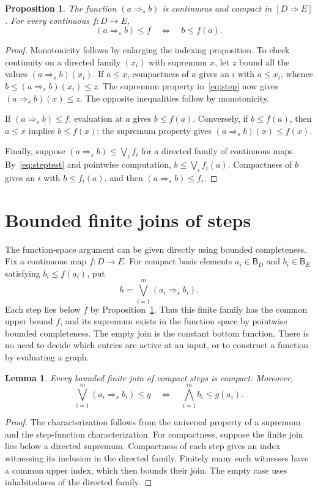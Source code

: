 \documentclass[11pt,a4paper]{article}
\newtheorem{lemma}[theorem]{Lemma}
\newtheorem{proposition}[theorem]{Proposition}
\theoremstyle{definition}
\theoremstyle{remark}
\newcommand{\B}{\mathsf B}
\newcommand{\Cont}[2]{[#1\mathbin{\Rightarrow}#2]}
\newcommand{\step}[2]{(#1\mathbin{\Rightarrow}_{\!s}#2)}
\newcommand{\lub}{\bigvee}
\begin{document}
\begin{proposition}\label{prop:step}
The function $\step a b$ is continuous and compact in $\Cont D E$.
For every continuous $f:D\to E$,
\begin{equation}\label{eq:steptest}
 \step a b\leq f \quad\Longleftrightarrow\quad b\leq f(a).
\end{equation}
\end{proposition}
\begin{proof}
Monotonicity follows by enlarging the indexing proposition. To check
continuity on a directed family $(x_i)$ with supremum $x$, let $z$ bound
all the values $\step a b(x_i)$. If $a\leq x$, compactness of $a$ gives
an $i$ with $a\leq x_i$, whence $b\leq\step a b(x_i)\leq z$.
The supremum property in~\eqref{eq:step} now gives $\step a b(x)\leq z$.
The opposite inequalities follow by monotonicity.

If $\step a b\leq f$, evaluation at $a$ gives $b\leq f(a)$.
Conversely, if $b\leq f(a)$, then $a\leq x$ implies $b\leq f(x)$;
the supremum property gives $\step a b(x)\leq f(x)$.

Finally, suppose $\step a b\leq\lub_i f_i$ for a directed family of
continuous maps. By~\eqref{eq:steptest} and pointwise computation,
$b\leq\lub_i f_i(a)$. Compactness of $b$ gives an $i$ with
$b\leq f_i(a)$, and then $\step a b\leq f_i$.
\end{proof}

\section{Bounded finite joins of steps}

The function-space argument can be given directly using bounded
completeness. Fix a continuous map $f:D\to E$. For compact basis elements
$a_i\in\B_D$ and $b_i\in\B_E$ satisfying $b_i\leq f(a_i)$, put
\[
 h=\bigvee_{i=1}^{m}\step{a_i}{b_i}.
\]
Each step lies below $f$ by Proposition~\ref{prop:step}. Thus this finite
family has the common upper bound $f$, and its supremum exists in the
function space by pointwise bounded completeness. The empty join is the
constant bottom function. There is no need to decide which entries are
active at an input, or to construct a function by evaluating a graph.

\begin{lemma}\label{lem:boundedsteps}
Every bounded finite join of compact steps is compact. Moreover,
\[
 \bigvee_{i=1}^{m}\step{a_i}{b_i}\leq g
 \quad\Longleftrightarrow\quad
 \bigwedge_{i=1}^{m} b_i\leq g(a_i).
\]
\end{lemma}
\begin{proof}
The characterization follows from the universal property of a supremum
and the step-function characterization. For compactness, suppose the
finite join lies below a directed supremum. Compactness of each step
gives an index witnessing its inclusion in the directed family. Finitely
many such witnesses have a common upper index, which then bounds their
join. The empty case uses inhabitedness of the directed family.
\end{proof}
\end{document}
